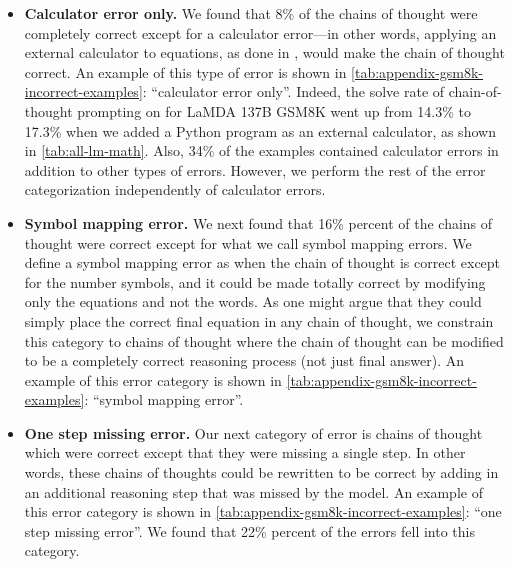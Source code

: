 \documentclass[]{article}
\theoremstyle{plain}
\theoremstyle{definition}
\theoremstyle{remark}
\newcommand{\lamda}[0]{LaMDA}
\begin{document}
\begin{itemize}[leftmargin=*,topsep=0pt]
    \itemsep0em 
    \item \textbf{Calculator error only.} We found that 8\% of the chains of thought were completely correct except for a calculator error---in other words, applying an external calculator to equations, as done in \citet{cobbe2021training}, would make the chain of thought correct. An example of this type of error is shown in \cref{tab:appendix-gsm8k-incorrect-examples}: ``calculator error only''. Indeed, the solve rate of chain-of-thought prompting on for \lamda{} 137B GSM8K went up from 14.3\% to 17.3\% when we added a Python program as an external calculator, as shown in \cref{tab:all-lm-math}. 
    Also, 34\% of the examples contained calculator errors in addition to other types of errors. However, we perform the rest of the error categorization independently of calculator errors.
    \item \textbf{Symbol mapping error.} We next found that 16\% percent of the chains of thought were correct except for what we call symbol mapping errors. We define a symbol mapping error as when the chain of thought is correct except for the number symbols, and it could be made totally correct by modifying only the equations and not the words. 
    As one might argue that they could simply place the correct final equation in any chain of thought, we constrain this category to chains of thought where the chain of thought can be modified to be a completely correct reasoning process (not just final answer). An example of this error category is shown in \cref{tab:appendix-gsm8k-incorrect-examples}: ``symbol mapping error''.
    \item \textbf{One step missing error.} Our next category of error is chains of thought which were correct except that they were missing a single step. In other words, these chains of thoughts could be rewritten to be correct by adding in an additional reasoning step that was missed by the model. An example of this error category is shown in \cref{tab:appendix-gsm8k-incorrect-examples}: ``one step missing error''. We found that 22\% percent of the errors fell into this category.
\end{itemize}
\end{document}
